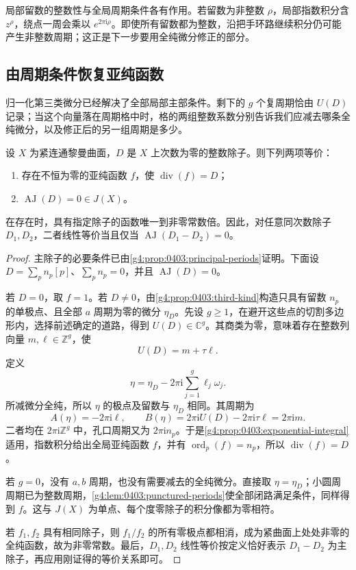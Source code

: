 局部留数的整数性与全局周期条件各有作用。若留数为非整数 \(\rho\)，局部指数积分含 \(z^\rho\)，绕点一周会乘以 \(e^{2\pi\mathrm{i}\rho}\)。即使所有留数都为整数，沿把手环路继续积分仍可能产生非整数周期；这正是下一步要用全纯微分修正的部分。

\subsection{由周期条件恢复亚纯函数}
\label{g4:subsec:0403:04}
归一化第三类微分已经解决了全部局部主部条件。剩下的 \(g\) 个复周期恰由 \(U(D)\) 记录；当这个向量落在周期格中时，格的两组整数系数分别告诉我们应减去哪条全纯微分，以及修正后的另一组周期是多少。

\begin{theorem}[Abel 定理]
	\label{g4:thm:0403:abel}
	设 \(X\) 为紧连通黎曼曲面，\(D\) 是 \(X\) 上次数为零的整数除子。则下列两项等价：
	\begin{enumerate}
		\item 存在不恒为零的亚纯函数 \(f\)，使 \(\operatorname{div}(f)=D\)；
		\item \(\operatorname{AJ}(D)=0\in J(X)\)。
	\end{enumerate}
	在存在时，具有指定除子的函数唯一到非零常数倍。因此，对任意同次数除子 \(D_1,D_2\)，二者线性等价当且仅当 \(\operatorname{AJ}(D_1-D_2)=0\)。
\end{theorem}
\begin{proof}
	主除子的必要条件已由\cref{g4:prop:0403:principal-periods}证明。下面设 \(D=\sum_p n_p[p]\)、\(\sum_p n_p=0\)，并且 \(\operatorname{AJ}(D)=0\)。

	若 \(D=0\)，取 \(f=1\)。若 \(D\ne0\)，由\cref{g4:prop:0403:third-kind}构造只具有留数 \(n_p\) 的单极点、且全部 \(a\) 周期为零的微分 \(\eta_D\)。先设 \(g\ge1\)，在避开这些点的切割多边形内，选择前述确定的道路，得到 \(U(D)\in\mathbb C^g\)。其商类为零，意味着存在整数列向量 \(m,\ell\in\mathbb Z^g\)，使
	\[
		U(D)=m+\tau\ell.
	\]
	定义
	\begin{equation}
		\label{g4:eq:0403:integer-period-correction}
		\eta=\eta_D-2\pi\mathrm{i}
		\sum_{j=1}^g\ell_j\omega_j.
	\end{equation}
	所减微分全纯，所以 \(\eta\) 的极点及留数与 \(\eta_D\) 相同。其周期为
	\[
		A(\eta)=-2\pi\mathrm{i}\ell,\qquad
		B(\eta)
		=2\pi\mathrm{i}U(D)-2\pi\mathrm{i}\tau\ell
		=2\pi\mathrm{i}m.
	\]
	二者均在 \(2\pi\mathrm{i}\mathbb Z^g\) 中，孔口周期又为 \(2\pi\mathrm{i}n_p\)。于是\cref{g4:prop:0403:exponential-integral}适用，指数积分给出全局亚纯函数 \(f\)，并有 \(\operatorname{ord}_p(f)=n_p\)，所以 \(\operatorname{div}(f)=D\)。

	若 \(g=0\)，没有 \(a,b\) 周期，也没有需要减去的全纯微分。直接取 \(\eta=\eta_D\)；小圆周周期已为整数周期，\cref{g4:lem:0403:punctured-periods}使全部闭路满足条件，同样得到 \(f\)。这与 \(J(X)\) 为单点、每个度零除子的积分像都为零相符。

	若 \(f_1,f_2\) 具有相同除子，则 \(f_1/f_2\) 的所有零极点都相消，成为紧曲面上处处非零的全纯函数，故为非零常数。最后，\(D_1,D_2\) 线性等价按定义恰好表示 \(D_1-D_2\) 为主除子，再应用刚证得的等价关系即可。
\end{proof}

